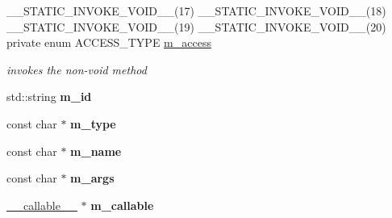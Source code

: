 \begin{DoxyCompactItemize}
\+\_\+\+\_\+\+S\+T\+A\+T\+I\+C\+\_\+\+I\+N\+V\+O\+K\+E\+\_\+\+V\+O\+I\+D\+\_\+\+\_\+(17) \+\_\+\+\_\+\+S\+T\+A\+T\+I\+C\+\_\+\+I\+N\+V\+O\+K\+E\+\_\+\+V\+O\+I\+D\+\_\+\+\_\+(18) \+\_\+\+\_\+\+S\+T\+A\+T\+I\+C\+\_\+\+I\+N\+V\+O\+K\+E\+\_\+\+V\+O\+I\+D\+\_\+\+\_\+(19) \+\_\+\+\_\+\+S\+T\+A\+T\+I\+C\+\_\+\+I\+N\+V\+O\+K\+E\+\_\+\+V\+O\+I\+D\+\_\+\+\_\+(20) private enum A\+C\+C\+E\+S\+S\+\_\+\+T\+Y\+PE \hyperlink{classagm_1_1reflection_1_1_static_method_desc_a46a4d3df915ea90ecd506d614e6f94bf}{m\+\_\+access}
\begin{DoxyCompactList}\small\item\em invokes the non-\/void method \end{DoxyCompactList}\item 
std\+::string {\bfseries m\+\_\+id}\hypertarget{classagm_1_1reflection_1_1_static_method_desc_a588ca5ad131d34086fec9516996484e3}{}\label{classagm_1_1reflection_1_1_static_method_desc_a588ca5ad131d34086fec9516996484e3}

\item 
const char $\ast$ {\bfseries m\+\_\+type}\hypertarget{classagm_1_1reflection_1_1_static_method_desc_a544c4da1ac4a6069f60d31604d74e6f0}{}\label{classagm_1_1reflection_1_1_static_method_desc_a544c4da1ac4a6069f60d31604d74e6f0}

\item 
const char $\ast$ {\bfseries m\+\_\+name}\hypertarget{classagm_1_1reflection_1_1_static_method_desc_a13b3f8cd22bd70777127942fcbc81da2}{}\label{classagm_1_1reflection_1_1_static_method_desc_a13b3f8cd22bd70777127942fcbc81da2}

\item 
const char $\ast$ {\bfseries m\+\_\+args}\hypertarget{classagm_1_1reflection_1_1_static_method_desc_a68291614bc4066533d071053c6fddcf7}{}\label{classagm_1_1reflection_1_1_static_method_desc_a68291614bc4066533d071053c6fddcf7}

\item 
\hyperlink{structagm_1_1reflection_1_1____callable____}{\+\_\+\+\_\+callable\+\_\+\+\_\+} $\ast$ {\bfseries m\+\_\+callable}\hypertarget{classagm_1_1reflection_1_1_static_method_desc_aa567460a593ccb7a85fc810149fab7d0}{}\label{classagm_1_1reflection_1_1_static_method_desc_aa567460a593ccb7a85fc810149fab7d0}

\end{DoxyCompactItemize}

